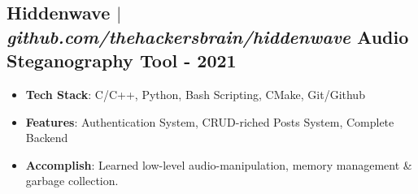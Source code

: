 \documentclass[11pt]{article} %
\begin{document}
\subsection{Hiddenwave $|$ \normalfont\textit{github.com/thehackersbrain/hiddenwave} \hfill Audio Steganography Tool - \textbf{2021}}
\vspace{3pt}
\begin{itemize}
  \item \textbf{Tech Stack}: C/C++, Python, Bash Scripting, CMake, Git/Github
  \item \textbf{Features}: Authentication System, CRUD-riched Posts System, Complete Backend
  \item \textbf{Accomplish}: Learned low-level audio-manipulation, memory management \& garbage collection.
\end{itemize}
\end{document}
